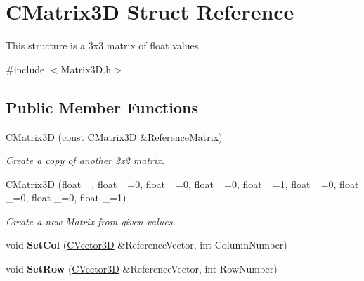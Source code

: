 \hypertarget{struct_c_matrix3_d}{}\section{C\+Matrix3D Struct Reference}
\label{struct_c_matrix3_d}


This structure is a 3x3 matrix of float values.  




{\ttfamily \#include $<$Matrix3\+D.\+h$>$}

\subsection*{Public Member Functions}
\begin{DoxyCompactItemize}
\item 
\hyperlink{struct_c_matrix3_d_afc29d9e0be5fbd9158024ff0f704eaaf}{C\+Matrix3D} (const \hyperlink{struct_c_matrix3_d}{C\+Matrix3D} \&Reference\+Matrix)\hypertarget{struct_c_matrix3_d_afc29d9e0be5fbd9158024ff0f704eaaf}{}\label{struct_c_matrix3_d_afc29d9e0be5fbd9158024ff0f704eaaf}

\begin{DoxyCompactList}\small\item\em Create a copy of another 2x2 matrix. \end{DoxyCompactList}\item 
\hyperlink{struct_c_matrix3_d_a814e4772ce6cc9f80beea003423f3140}{C\+Matrix3D} (float \+\_, float \+\_=0, float \+\_=0, float \+\_=0, float \+\_=1, float \+\_=0, float \+\_=0, float \+\_=0, float \+\_=1)\hypertarget{struct_c_matrix3_d_a814e4772ce6cc9f80beea003423f3140}{}\label{struct_c_matrix3_d_a814e4772ce6cc9f80beea003423f3140}

\begin{DoxyCompactList}\small\item\em Create a new Matrix from given values. \end{DoxyCompactList}\item 
void {\bfseries Set\+Col} (\hyperlink{struct_c_vector3_d}{C\+Vector3D} \&Reference\+Vector, int Column\+Number)\hypertarget{struct_c_matrix3_d_ab964eb4cac748dd26e2eb1c18843f73e}{}\label{struct_c_matrix3_d_ab964eb4cac748dd26e2eb1c18843f73e}

\item 
void {\bfseries Set\+Row} (\hyperlink{struct_c_vector3_d}{C\+Vector3D} \&Reference\+Vector, int Row\+Number)\hypertarget{struct_c_matrix3_d_aaadd25cc4201844649d38b10a2844bd5}{}\label{struct_c_matrix3_d_aaadd25cc4201844649d38b10a2844bd5}


\end{DoxyCompactItemize}
